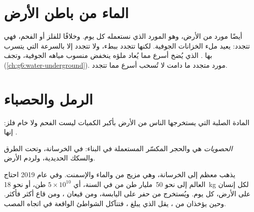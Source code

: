 \section{الماء من باطن الأرض}

 أيضًا مورد من الأرض، وهو المورد الذي نستعمله كل يوم.
وخلافًا للفلز أو الفحم، فهي تتجدد:  يعيد ملء الخزانات الجوفية.
لكنها تتجدد ببطء، ولا تتجدد إلا بالسرعة التي يتسرب بها .  الذي يُضخ أسرع مما يُعاد ملؤه ينخفض منسوب مياهه الجوفية، وتجف
 (\cref{ch:g6:water-underground}).  مورد متجدد ما
دامت لا تُسحب أسرع مما تتجدد.

\section{الرمل والحصباء}

المادة الصلبة التي يستخرجها الناس من الأرض بأكبر الكميات ليست الفحم
ولا خام فلز: إنها  .

\begin{definition}[الحصويات]\label{def:g9:earth-resources:aggregate}
\emph{الحصويات} هي   والحجر المكسّر المستعملة
في البناء: في الخرسانة، وتحت الطرق والسكك الحديدية، ولردم
الأرض.
\end{definition}

يذهب معظم  إلى الخرسانة، وهي مزيج من   والماء
والإسمنت. وفي عام 2019 احتاج العالم إلى نحو 50~مليار طن من 
 في السنة، أي $5 \times 10^{10}$ طن، أو نحو \qty{18}{kg} لكل
إنسان على الأرض، كل يوم. ويُستخرج   من حفر على اليابسة،
ومن قيعان ، ومن قاع  أكثر فأكثر. وحين يؤخذان من ، يقل
 الذي يبلغ ، فتتآكل الشواطئ الواقعة في اتجاه المصب.

